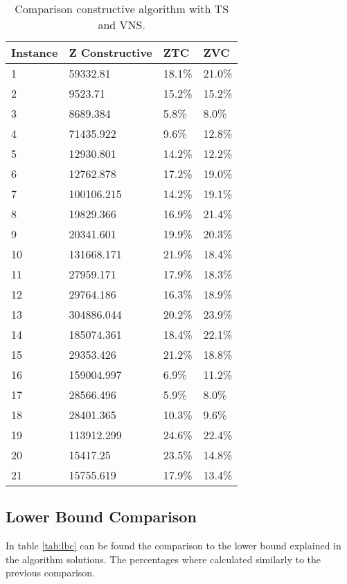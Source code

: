 \documentclass[10pt,twoside]{article}
\begin{document}
\begin{table}[]
\centering
\begin{tabular}{llll}
\hline
Instance & Z Constructive & ZTC    & ZVC    \\ \hline
1        & 59332.81       & 18.1\% & 21.0\% \\
2        & 9523.71        & 15.2\% & 15.2\% \\
3        & 8689.384       & 5.8\%  & 8.0\%  \\
4        & 71435.922      & 9.6\%  & 12.8\% \\
5        & 12930.801      & 14.2\% & 12.2\% \\
6        & 12762.878      & 17.2\% & 19.0\% \\
7        & 100106.215     & 14.2\% & 19.1\% \\
8        & 19829.366      & 16.9\% & 21.4\% \\
9        & 20341.601      & 19.9\% & 20.3\% \\
10       & 131668.171     & 21.9\% & 18.4\% \\
11       & 27959.171      & 17.9\% & 18.3\% \\
12       & 29764.186      & 16.3\% & 18.9\% \\
13       & 304886.044     & 20.2\% & 23.9\% \\
14       & 185074.361     & 18.4\% & 22.1\% \\
15       & 29353.426      & 21.2\% & 18.8\% \\
16       & 159004.997     & 6.9\%  & 11.2\% \\
17       & 28566.496      & 5.9\%  & 8.0\%  \\
18       & 28401.365      & 10.3\% & 9.6\%  \\
19       & 113912.299     & 24.6\% & 22.4\% \\
20       & 15417.25       & 23.5\% & 14.8\% \\
21       & 15755.619      & 17.9\% & 13.4\% \\ \hline
\end{tabular}
\caption{Comparison constructive algorithm with TS and VNS.}
\label{tab:cons}
\end{table}

\subsection{Lower Bound Comparison}\label{sec_lbc}
In table \ref{tab:lbc} can be found the comparison to the lower bound explained in the algorithm solutions. The percentages where calculated similarly to the previous comparison.
\end{document}
